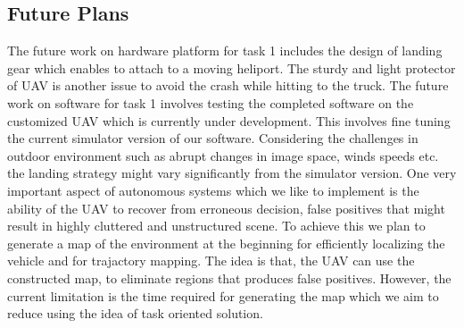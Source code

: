 \documentclass{standalone}
\begin{document}
\subsection{Future Plans}
The future work on hardware platform for task 1 includes the design of landing gear which enables to attach to a moving heliport. The sturdy and light protector of UAV is another issue to avoid the crash while hitting to the truck.
The future work on software for task 1 involves testing the completed software on the customized UAV which is currently under development. This involves fine tuning the current simulator version of our software. Considering the challenges in outdoor environment such as abrupt changes in image space, winds speeds etc. the landing strategy might vary significantly from the simulator version. One very important aspect of autonomous systems which we like to implement is the ability of the UAV to recover from erroneous decision, false positives that might result in highly cluttered and unstructured scene. To achieve this we plan to generate a map of the environment at the beginning for efficiently localizing the vehicle and for trajactory mapping. The idea is that, the UAV can use the constructed map, to eliminate regions that produces false positives. However, the current limitation is the time required for generating the map which we aim to reduce using the idea of task oriented solution.
\end{document}

